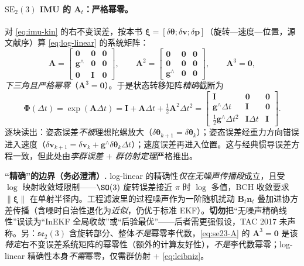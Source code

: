 \paragraph{$\mathrm{SE}_2(3)$ IMU 的 $\mathbf{A}_t$：严格幂零。}
对 \cref{eq:imu-kin} 的右不变误差，按本书 $\boldsymbol{\xi}=[\delta\boldsymbol{\theta};\delta\mathbf{v};\delta\mathbf{p}]$（旋转—速度—位置，源文献序）算 \cref{eq:log-linear} 的系统矩阵\cite{barrau2017invariant}：
\begin{equation}
  \mathbf{A}=\begin{bmatrix}\mathbf{0}&\mathbf{0}&\mathbf{0}\\\mathbf{g}^\wedge&\mathbf{0}&\mathbf{0}\\\mathbf{0}&\mathbf{I}&\mathbf{0}\end{bmatrix},\qquad
  \mathbf{A}^2=\begin{bmatrix}\mathbf{0}&\mathbf{0}&\mathbf{0}\\\mathbf{0}&\mathbf{0}&\mathbf{0}\\\mathbf{g}^\wedge&\mathbf{0}&\mathbf{0}\end{bmatrix},\qquad \mathbf{A}^3=\mathbf{0},
  \label{eq:se23-A}
\end{equation}
\emph{下三角且严格幂零}（$\mathbf{A}^3=\mathbf{0}$）。于是状态转移矩阵\emph{精确}截断为\cite{barrau2017invariant}
\begin{equation}
  \boldsymbol{\Phi}(\Delta t)=\exp(\mathbf{A}\Delta t)=\mathbf{I}+\mathbf{A}\Delta t+\tfrac12\mathbf{A}^2\Delta t^2
  =\begin{bmatrix}\mathbf{I}&\mathbf{0}&\mathbf{0}\\\mathbf{g}^\wedge\Delta t&\mathbf{I}&\mathbf{0}\\\tfrac12\mathbf{g}^\wedge\Delta t^2&\mathbf{I}\Delta t&\mathbf{I}\end{bmatrix}.
  \label{eq:se23-Phi}
\end{equation}
逐块读出：姿态误差\emph{不被}理想陀螺放大（$\delta\boldsymbol{\theta}_{k+1}=\delta\boldsymbol{\theta}_k$）；姿态误差经重力方向错误进入速度（$\delta\mathbf{v}_{k+1}=\delta\mathbf{v}_k+\mathbf{g}^\wedge\delta\boldsymbol{\theta}_k\Delta t$）；速度误差再进入位置。这与经典惯导误差方程一致，但此处由\emph{李群误差 $+$ 群仿射定理}严格推出。

\begin{note}
\textbf{“精确”的边界（务必澄清）.}\;
log-linear 的精确性\emph{仅在无噪声传播段}成立，且受 $\log$ 映射收敛域限制——$\SO(3)$ 旋转误差接近 $\pi$ 时 $\log$ 多值，BCH 收敛要求 $\|\boldsymbol{\xi}\|$ 在单射半径内。工程滤波里的过程噪声作为一阶随机扰动 $\mathbf{B}_t\mathbf{n}_t$ 叠加进协方差传播（含噪时自治性退化为\emph{近似}，仍优于标准 EKF）。\textbf{切勿}把“无噪声精确线性”误读为“InEKF 全局收敛”或“后验最优”——后者需更强假设，TAC 2017 未声称。另：$\mathfrak{se}_2(3)$ 含旋转部分、整体\emph{不是}幂零李代数，\cref{eq:se23-A} 的 $\mathbf{A}^3=\mathbf{0}$ 是该\emph{特定}右不变误差系统矩阵的幂零性（额外的计算友好性），\emph{不是}李代数幂零；log-linear 精确性本身\emph{不需}幂零，仅需群仿射 $+$ \cref{eq:leibniz}。
\end{note}

